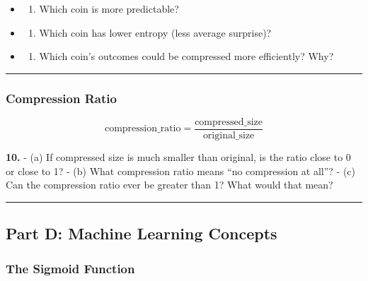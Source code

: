 \documentclass[
  11pt,
]{article}
\providecommand{\tightlist}{%
  \setlength{\itemsep}{0pt}\setlength{\parskip}{0pt}}
\begin{document}
\begin{itemize}
\item
  \begin{enumerate}
  \def\labelenumi{(\alph{enumi})}
  \tightlist
  \item
    Which coin is more predictable?
  \end{enumerate}
\item
  \begin{enumerate}
  \def\labelenumi{(\alph{enumi})}
  \setcounter{enumi}{1}
  \tightlist
  \item
    Which coin has lower entropy (less average surprise)?
  \end{enumerate}
\item
  \begin{enumerate}
  \def\labelenumi{(\alph{enumi})}
  \setcounter{enumi}{2}
  \tightlist
  \item
    Which coin's outcomes could be compressed more efficiently? Why?
  \end{enumerate}
\end{itemize}

\begin{center}\rule{0.5\linewidth}{0.5pt}\end{center}

\hypertarget{compression-ratio}{%
\subsubsection{Compression Ratio}\label{compression-ratio}}

\[\text{compression\_ratio} = \dfrac{\text{compressed\_size}}{\text{original\_size}}\]

\textbf{10.} - (a) If compressed size is much smaller than original, is
the ratio close to 0 or close to 1? - (b) What compression ratio means
``no compression at all''? - (c) Can the compression ratio ever be
greater than 1? What would that mean?

\begin{center}\rule{0.5\linewidth}{0.5pt}\end{center}

\hypertarget{part-d-machine-learning-concepts}{%
\subsection{Part D: Machine Learning
Concepts}\label{part-d-machine-learning-concepts}}

\hypertarget{the-sigmoid-function}{%
\subsubsection{The Sigmoid Function}\label{the-sigmoid-function}}
\end{document}

